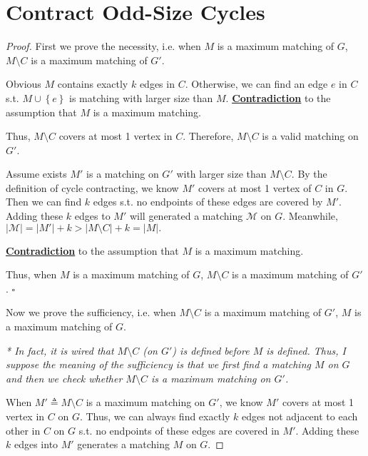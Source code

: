 \documentclass{article}
\newcommand{\whiteqed}{\hfill $\square$\par}
\newcommand{\set}[1]{\left\{#1\right\}}
\begin{document}
\section{Contract Odd-Size Cycles}
\vspace{1em}
\begin{proof}
    First we prove the necessity, i.e. when $M$ is a maximum matching of $G$, $M\setminus C$ is a maximum matching of $G'$.
    
    \hspace{1.3em}
    Obvious $M$ contains exactly $k$ edges in $C$. Otherwise, we can find an edge $e$ in $C$ s.t. $M\cup\set{e}$ is matching with larger size than $M$. \underline{\textbf{Contradiction}} to the assumption that $M$ is a maximum matching.
    
    \hspace{1.3em}
    Thus, $M\setminus C$ covers at most 1 vertex in $C$. Therefore, $M\setminus C$ is a valid matching on $G'$.
    
    \hspace{1.3em}
    Assume exists $M'$ is a matching on $G'$ with larger size than $M\setminus C$. By the definition of cycle contracting, we know $M'$ covers at most 1 vertex of $C$ in $G$. Then we can find $k$ edges s.t. no endpoints of these edges are covered by $M'$. Adding these $k$ edges to $M'$ will generated a matching $\mathcal{M}$ on $G$. Meanwhile, $|\mathcal{M}|=|M'|+k>|M\setminus C|+k = |M|.$
    
    \hspace{1.3em}
    \underline{\textbf{Contradiction}} to the assumption that $M$ is a maximum matching.
    
    \hspace{1.3em}
    Thus, when $M$ is a maximum matching of $G$, $M\setminus C$ is a maximum matching of $G'$. \whiteqed
    
    \vspace{1em} \hspace{1.3em}
    Now we prove the sufficiency, i.e. when $M\setminus C$ is a maximum matching of $G'$, $M$ is a maximum matching of $G$.
    
    \hspace{1.3em}
    \textit{* In fact, it is wired that $M\setminus C$ (on $G'$) is defined before $M$ is defined. Thus, I suppose the meaning of the sufficiency is that we first find a matching $M$ on $G$ and then we check whether $M\setminus C$ is a maximum matching on $G'$.}
    
    \hspace{1.3em}
    When $M'\triangleq M\setminus C$ is a maximum matching on $G'$, we know $M'$ covers at most 1 vertex in $C$ on $G$. Thus, we can always find exactly $k$ edges not adjacent to each other in $C$ on $G$ s.t. no endpoints of these edges are covered in $M'$. Adding these $k$ edges into $M'$ generates a matching $M$ on $G$. 
    

\end{proof}
\end{document}
